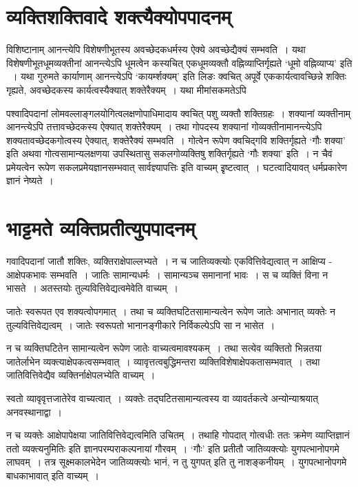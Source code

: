 {\section*{व्यक्तिशक्तिवादे शक्त्यैक्योपपादनम्}

विशिष्टानाम् आनन्त्येपि विशेषणीभूतस्य अवच्छेदकधर्मस्य ऐक्ये अवच्छेद्यैक्यं सम्भवति~। यथा विशेषणीभूतधूमव्यक्तीनां आनन्त्येऽपि धूमत्वेन कस्यचित् एकधूमव्यक्तौ वह्निव्याप्तिर्गृह्यते ‘धूमो वह्निव्याप्य’ इति ~। यथा गुरुमते कार्याणाम् आनन्त्येऽपि ‘कायर्म्शक्यम्’ इति लिङः क्वचित् अपूर्वे एककार्यत्वावच्छिन्ने शक्तिः गृह्यते, अवच्छेदकस्य कार्यत्वस्यैक्यात् शक्तेरैक्यम्~। यथा मीमांसकमतेऽपि 	

पश्वादिपदानां लोमवल्लाङ्गलयोगित्वलक्षणोपाधिमादाय क्वचित् पशु व्यक्तौ शक्तिग्रहः~। शक्यानां व्यक्तीनाम् आनन्त्येऽपि तत्तावच्छेदकस्य ऐक्यात् शक्तेरैक्यम्~। तथा गोपदस्य शक्यानां गोव्यक्तीनामानन्त्येऽपि शक्यतावच्छेदकगोत्वस्य ऐक्यात्, शक्तेरैक्यं सम्भवति~। { गोत्वेन रूपेण क्वचिद्गवि शक्तिर्गृह्यते ‘गौः शक्या’ इति } अथवा गोत्वसामान्यलक्षणया उपस्थितासु सकलगोव्यक्तिषु शक्तिर्गृह्यते ‘गौः शक्या’ इति~। न चैवं प्रमेयत्वेन रूपेण सकलप्रमेयज्ञानसम्भवात् सार्वज्ञ्यापत्तिः इति वाच्यम्  इृष्टत्वात्~। घटत्वादियावत् धर्मप्रकारेण ज्ञानं नेष्यते~। 

\section*{भाट्टमते व्यक्तिप्रतीत्युपपादनम्}

गवादिपदानां जातौ शक्तिः, व्यक्तिराक्षेपाल्लभ्यते~। न च जातिव्यक्त्योः एकवित्तिवेद्यत्वात् न आक्षिप्य - आक्षेपकभावः सम्भवति~। जातिः सामान्यधर्मः~। सामान्यञ्च समानानां भावः~। स च व्यक्तिं विना न भासते~। अतस्तयोः तुल्यवित्तिवेद्यत्वमेवेति वाच्यम्~। 

जातेः स्वरूपत एव शक्यत्वोपगमात्~। तथा च व्यक्तिघटितसामान्यत्वेन रूपेण जातेः अभानात् व्यक्तेः न तुल्यवित्तिवेद्यत्वम्~। जातेः स्वरूपतो भानानङ्गीकारे  निर्विकल्पेऽपि सा न भासेत~। 

न च व्यक्तिघटितेन सामान्यत्वेन रूपेण जातेः वाच्यत्वमावश्यकम्~। तथा सत्येव व्यक्तितो भिन्नतया जातेर्लाभेन व्यक्त्याक्षेपकत्वसम्भवात्~। व्यावृत्तत्वबुद्धिमन्तरा व्यक्तिविशेषाक्षेपकतासम्भवात्~। तथा जातिवित्तिवेद्यैव व्यक्तिर्नाक्षेपलभ्येति वाच्यम्~। 

स्वतो व्यावृवृत्तजातेरेव वाच्यत्वात्~। व्यक्तेः तद्घटितसामान्यत्वस्य वा व्यावर्तकत्वे अन्योन्याश्रयात्  अनवस्थानाद्वा~। 

न च व्यक्तेः आक्षेपापेक्षया जातिवित्तिवेद्यत्वमिति उचितम्~। तथाहि गोपदात् गोत्वधीः ततः क्रमेण व्याप्तिज्ञानं ततो व्यक्त्यनुमितिः इति ज्ञानपरम्पराकल्पनायां गौरवम्~। ‘गौः’ इति प्रतीतौ जातिव्यक्त्योः युगपत्भानोपगमे लाघवम्~। तत्र सूक्ष्मकालभेदेन जातिव्यक्त्योः भानं, न तु युगपत् इति तु नाशङ्कनीयम्~। युगपत्भानोपगमे बाधकाभावात् इति वाच्यम्~। 

}
